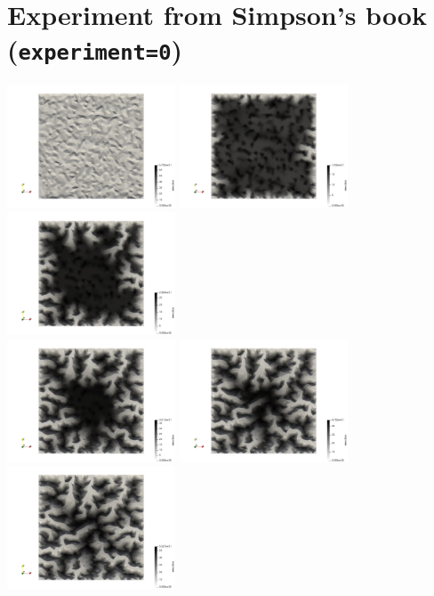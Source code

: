 \section*{Experiment from Simpson's book ({\tt experiment=0})}

\begin{center}
\includegraphics[width=5cm]{python_codes/fieldstone_140/results/exp0/z_000}
\includegraphics[width=5cm]{python_codes/fieldstone_140/results/exp0/z_100}
\includegraphics[width=5cm]{python_codes/fieldstone_140/results/exp0/z_200}\\
\includegraphics[width=5cm]{python_codes/fieldstone_140/results/exp0/z_300}
\includegraphics[width=5cm]{python_codes/fieldstone_140/results/exp0/z_400}
\includegraphics[width=5cm]{python_codes/fieldstone_140/results/exp0/z_500}
\end{center}


